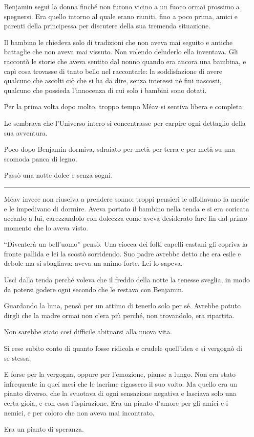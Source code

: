 Benjamin seguì la donna finché non furono vicino a un fuoco ormai prossimo a spegnersi. Era quello
intorno al quale erano riuniti, fino a poco prima, amici e parenti della principessa per discutere
della sua tremenda situazione.

Il bambino le chiedeva solo di tradizioni che non aveva mai seguito e antiche battaglie che non
aveva mai vissuto. Non volendo deluderlo ella inventava. Gli raccontò le storie che aveva sentito
dal nonno quando era ancora una bambina, e capì cosa trovasse di tanto bello nel raccontarle: la
soddisfazione di avere qualcuno che ascolti ciò che si ha da dire, senza interessi né fini nascosti,
qualcuno che possieda l'innocenza di cui solo i bambini sono dotati.

Per la prima volta dopo molto, troppo tempo Méav si sentiva libera e completa.

Le sembrava che l'Universo intero si concentrasse per carpire ogni dettaglio della sua avventura.

Poco dopo Benjamin dormiva, sdraiato per metà per terra e per metà su una scomoda panca di legno.

Passò una notte dolce e senza sogni.

\plainbreak{1}

Méav invece non riusciva a prendere sonno: troppi pensieri le affollavano la mente e le impedivano
di dormire. Aveva portato il bambino nella tenda e si era coricata accanto a lui, carezzandolo con
dolcezza come aveva desiderato fare fin dal primo momento che lo aveva visto.

``Diventerà un bell'uomo'' pensò. Una ciocca dei folti capelli castani gli copriva la fronte pallida
e lei la scostò sorridendo. Suo padre avrebbe detto che era esile e debole ma si sbagliava: aveva un
animo forte. Lei lo sapeva.

Uscì dalla tenda perché voleva che il freddo della notte la tenesse sveglia, in modo da potersi
godere ogni secondo che le restava con Benjamin.

Guardando la luna, pensò per un attimo di tenerlo solo per sé. Avrebbe potuto dirgli che la madre
ormai non c'era più perché, non trovandolo, era ripartita.

Non sarebbe stato così difficile abituarsi alla nuova vita.

Si rese subito conto di quanto fosse ridicola e crudele quell'idea e si vergognò di se stessa.

E forse per la vergogna, oppure per l'emozione, pianse a lungo. Non era stato infrequente in quei
mesi che le lacrime rigassero il suo volto. Ma quello era un pianto diverso, che la svuotava di ogni
sensazione negativa e lasciava solo una certa gioia, e con essa l'ispirazione. Era un pianto d'amore
per gli amici e i nemici, e per coloro che non aveva mai incontrato.

Era un pianto di speranza.
